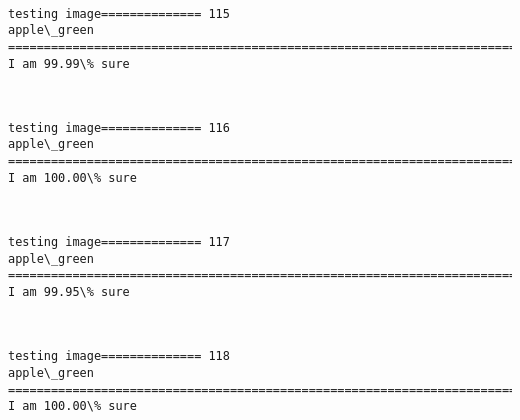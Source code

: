 \documentclass[11pt]{article}
\begin{document}
    \begin{center}
    \end{center}
    { \hspace*{\fill} \\}
    
    \begin{Verbatim}[commandchars=\\\{\}]
testing image============== 115
apple\_green
============================================================================
I am 99.99\% sure

    \end{Verbatim}

    \begin{center}
    \end{center}
    { \hspace*{\fill} \\}
    
    \begin{Verbatim}[commandchars=\\\{\}]
testing image============== 116
apple\_green
============================================================================
I am 100.00\% sure

    \end{Verbatim}

    \begin{center}
    \end{center}
    { \hspace*{\fill} \\}
    
    \begin{Verbatim}[commandchars=\\\{\}]
testing image============== 117
apple\_green
============================================================================
I am 99.95\% sure

    \end{Verbatim}

    \begin{center}
    \end{center}
    { \hspace*{\fill} \\}
    
    \begin{Verbatim}[commandchars=\\\{\}]
testing image============== 118
apple\_green
============================================================================
I am 100.00\% sure

    \end{Verbatim}
\end{document}
